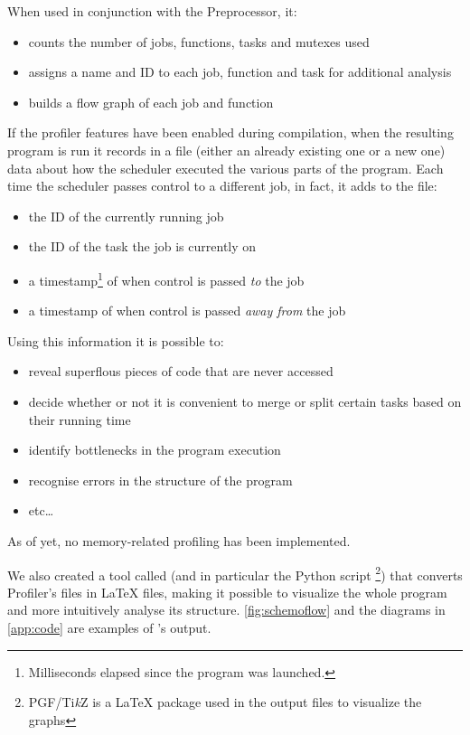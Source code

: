   \beforelist When used in conjunction with the \ScheMo{} Preprocessor, it:
  \begin{itemize}
    \item counts the number of jobs, functions, tasks and mutexes used
    \item assigns a name and ID to each job, function and task for
      additional analysis
    \item builds a flow graph of each job and function
  \end{itemize}
  \afterlist*
  \beforelist* If the profiler features have been enabled during compilation, when
  the resulting program is run it records in a  file
  (either an already existing one or a new one) data about how
  the scheduler executed the various parts of the program.
  Each time the scheduler passes control to a different job, in fact, it
  adds to the file:
  \begin{itemize}
    \item the ID of the currently running job
    \item the ID of the task the job is currently on
    \item a timestamp\footnote{\label{clock_note}Milliseconds elapsed
    since the program was launched.} of when control is passed
    \textit{to} the job
    \item a timestamp of when control is passed
    \textit{away from} the job
  \end{itemize}
  \afterlist
  \beforelist Using this information it is possible to:
  \begin{itemize}
    \item reveal superflous pieces of code that are never accessed
    \item decide whether or not it is convenient to merge or split
    certain tasks based on their running time
    \item identify bottlenecks in the program execution
    \item recognise errors in the structure of the program
    \item etc\ldots
  \end{itemize}
  \afterlist
  As of yet, no memory-related profiling has been implemented.

  We also created a tool called \ScheMoTeX{} (and in particular the
  Python script \footnote{PGF/Ti\textit{k}Z is a
  \LaTeX{} package used in the output files to visualize the graphs})
  that converts \ScheMo{} Profiler's  files in \LaTeX{}
   files, making it possible to visualize the whole program
  and more intuitively analyse its structure. \autoref{fig:schemoflow}
  and the diagrams in \autoref{app:code} are examples of
  \ScheMoTeX{}'s output.
